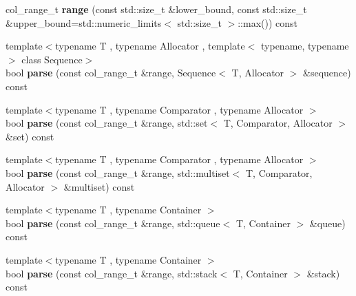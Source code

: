 \begin{DoxyCompactItemize}
\item 
\hypertarget{classstrtk_1_1token__grid_1_1row__type_ac3d14f17ea43538206ea0338660678ca}{col\-\_\-range\-\_\-t {\bfseries range} (const std\-::size\-\_\-t \&lower\-\_\-bound, const std\-::size\-\_\-t \&upper\-\_\-bound=std\-::numeric\-\_\-limits$<$ std\-::size\-\_\-t $>$\-::max()) const }\label{classstrtk_1_1token__grid_1_1row__type_ac3d14f17ea43538206ea0338660678ca}

\item 
\hypertarget{classstrtk_1_1token__grid_1_1row__type_a75ea7ce8599be620605c8ef9c88b979d}{{\footnotesize template$<$typename T , typename Allocator , template$<$ typename, typename $>$ class Sequence$>$ }\\bool {\bfseries parse} (const col\-\_\-range\-\_\-t \&range, Sequence$<$ T, Allocator $>$ \&sequence) const }\label{classstrtk_1_1token__grid_1_1row__type_a75ea7ce8599be620605c8ef9c88b979d}

\item 
\hypertarget{classstrtk_1_1token__grid_1_1row__type_abbaf5f9a29cb40ced67f237bd60ea78c}{{\footnotesize template$<$typename T , typename Comparator , typename Allocator $>$ }\\bool {\bfseries parse} (const col\-\_\-range\-\_\-t \&range, std\-::set$<$ T, Comparator, Allocator $>$ \&set) const }\label{classstrtk_1_1token__grid_1_1row__type_abbaf5f9a29cb40ced67f237bd60ea78c}

\item 
\hypertarget{classstrtk_1_1token__grid_1_1row__type_a66c9101aa34e9fe5eb160a3546b8eb50}{{\footnotesize template$<$typename T , typename Comparator , typename Allocator $>$ }\\bool {\bfseries parse} (const col\-\_\-range\-\_\-t \&range, std\-::multiset$<$ T, Comparator, Allocator $>$ \&multiset) const }\label{classstrtk_1_1token__grid_1_1row__type_a66c9101aa34e9fe5eb160a3546b8eb50}

\item 
\hypertarget{classstrtk_1_1token__grid_1_1row__type_ab057225c6af15c4c4501b6cd8a011157}{{\footnotesize template$<$typename T , typename Container $>$ }\\bool {\bfseries parse} (const col\-\_\-range\-\_\-t \&range, std\-::queue$<$ T, Container $>$ \&queue) const }\label{classstrtk_1_1token__grid_1_1row__type_ab057225c6af15c4c4501b6cd8a011157}

\item 
\hypertarget{classstrtk_1_1token__grid_1_1row__type_a334dba0a98711d9e780601f881644436}{{\footnotesize template$<$typename T , typename Container $>$ }\\bool {\bfseries parse} (const col\-\_\-range\-\_\-t \&range, std\-::stack$<$ T, Container $>$ \&stack) const }\label{classstrtk_1_1token__grid_1_1row__type_a334dba0a98711d9e780601f881644436}


\end{DoxyCompactItemize}
